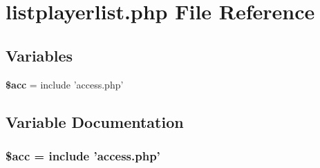 \section{listplayerlist.php File Reference}
\label{listplayerlist_8php}


\subsection*{Variables}
\begin{CompactItemize}
\item 
{\bf \$acc} = include 'access.php'
\end{CompactItemize}


\subsection{Variable Documentation}
\subsubsection{\setlength{\rightskip}{0pt plus 5cm}\$acc = include 'access.php'}\label{listplayerlist_8php_542926c588a05eb69553d79c83cf73da}


